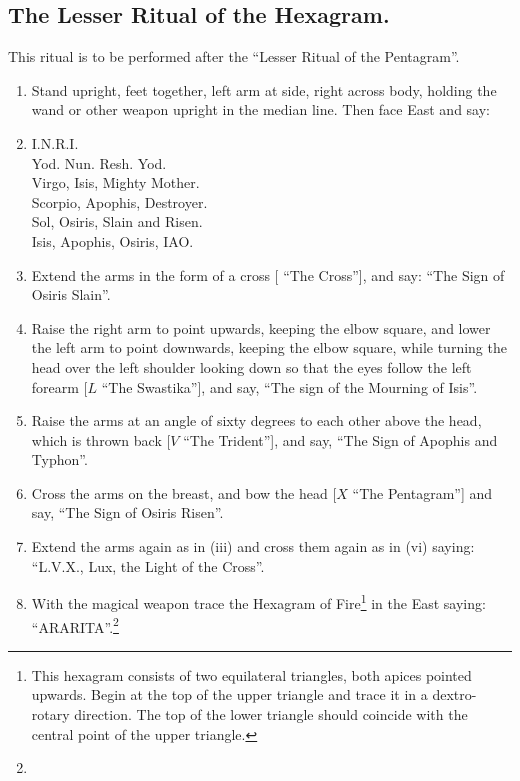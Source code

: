 \begin{Facing}
\subsection*{The Lesser Ritual of the Hexagram.}

This ritual is to be performed after the \enquote{Lesser Ritual of the Pentagram}.

\begin{enumerate}[label=(\textit{\Roman*})]
\item Stand upright, feet together, left arm at side, right across body, holding the wand or other weapon upright in the median line. Then face East and say:
\item I.N.R.I. \\
Yod. Nun. Resh. Yod. \\
Virgo, Isis, Mighty Mother. \\
Scorpio, Apophis, Destroyer. \\
Sol, Osiris, Slain and Risen. \\
Isis, Apophis, Osiris, IAO.
\item Extend the arms in the form of a cross [\Cross \textendash{} \enquote{The Cross}], and say: \enquote{The Sign of Osiris Slain}.
\item Raise the right arm to point upwards, keeping the elbow square, and lower the left arm to point downwards, keeping the elbow square, while turning the head over the left shoulder looking down so that the eyes follow the left forearm [$L$ \textendash{} \enquote{The Swastika}], and say, \enquote{The sign of the Mourning of Isis}.
\item Raise the arms at an angle of sixty degrees to each other above the head, which is thrown back [$V$ \textendash{} \enquote{The Trident}], and say, \enquote{The Sign of Apophis and Typhon}.
\item Cross the arms on the breast, and bow the head [$X$ \textendash{} \enquote{The Pentagram}] and say, \enquote{The Sign of Osiris Risen}.
\item Extend the arms again as in (iii) and cross them again as in (vi) saying: \enquote{L.V.X., Lux, the Light of the Cross}.
\item With the magical weapon trace the Hexagram of Fire\footnote{This hexagram consists of two equilateral triangles, both apices pointed upwards. Begin at the top of the upper triangle and trace it in a dextro-rotary direction. The top of the lower triangle should coincide with the central point of the upper triangle.} in the East saying: \enquote{ARARITA}.\footnote{\footnotemark}

\end{enumerate}
\end{Facing}
